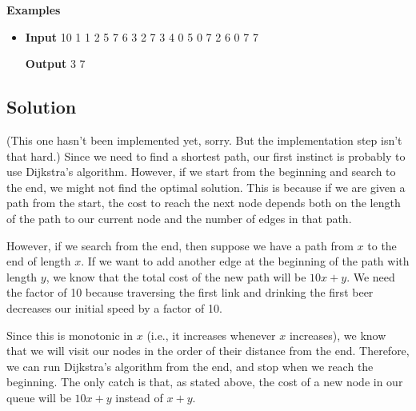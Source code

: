 \normalfont\documentclass[letterpaper,11pt]{article}
\begin{document}
\textbf{Examples}
\begin{itemize}
\item \textbf{Input}  10  1 1  2 5  7 6  3 2  7 3  4 0  5 0  7 2  6 0  7 7

\textbf{Output}    3 7
\end{itemize}

\subsection*{Solution}
(This one hasn't been implemented yet, sorry. But the implementation step isn't that hard.) \newline
Since we need to find a shortest path, our first instinct is probably to use Dijkstra's algorithm. However, if we start from the beginning and search to the end, we might not find the optimal solution. This is because if we are given a path from the start, the cost to reach the next node depends both on the length of the path to our current node and the number of edges in that path.

However, if we search from the end, then suppose we have a path from $x$ to the end of length $x$. If we want to add another edge at the beginning of the path with length $y$, we know that the total cost of the new path will be $10x + y$. We need the factor of 10 because traversing the first link and drinking the first beer decreases our initial speed by a factor of 10.

Since this is monotonic in $x$ (i.e., it increases whenever $x$ increases), we know that we will visit our nodes in the order of their distance from the end. Therefore, we can run Dijkstra's algorithm from the end, and stop when we reach the beginning. The only catch is that, as stated above, the cost of a new node in our queue will be $10x + y$ instead of $x + y$.
\end{document}
